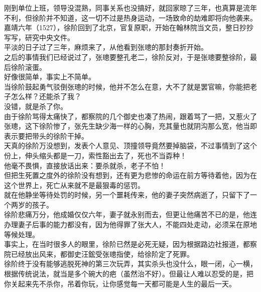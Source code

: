 \begin{multicols}{\theparacolNo}
刚到单位上班，领导没混熟，同事关系也没搞好，就回家晾了三年，也真算是流年不利，但徐阶并不知道，这一切不过是热身运动，一场致命的劫难即将向他袭来。\\

嘉靖六年（1527），徐阶回到了北京，官复原职，开始在翰林院当文员，整日抄抄写写，研究中央文件。\\

平淡的日子过了三年，麻烦来了，从他看到张璁的那封奏折开始。\\

之后的事情我们已经说过了，张璁要整孔老二，徐阶反对，于是张璁要整徐阶，最后徐阶滚蛋。\\

好像很简单，事实上不简单。\\

当徐阶鼓起勇气驳倒张璁的时候，他并不怎么在意，大不了就是罢官嘛，你能把老子怎么样？还能杀了我？\\

没错，就是杀了你。\\

由于徐阶骂得太痛快了，都察院的几个御史也凑了热闹，跟着骂了一把，又惹火了张璁，这下徐阶惨了，张先生缺少海一样的心胸，充其量也就阴沟那么宽，他当即表示要把带头的徐阶干掉。\\

天真的徐阶万没想到，发表个人意见、顶撞领导竟然要掉脑袋，不过事情到了这个份上，伸头缩头都是一刀，索性豁出去了，死也不当孬种！\\

他毫不畏惧，直接放话出来：要杀就杀，老子不怕！\\

但把生死置之度外的徐阶没有想到，还有更为悲惨的命运在前方等待着他，因为在这个世界上，死亡从来就不是最狠毒的惩罚。\\

就在他静坐等待处罚的时候，另一个噩耗传来，他的妻子突然病逝了，只留下了一个两岁的孩子。\\

徐阶悲痛万分，他成婚仅仅六年，妻子就永别而去，但更让他痛苦不已的是，他连办理妻子后事的能力都没有，因为他得罪了张大人，不能四处走动，必须呆在原地等候处理。\\

事实上，在当时很多人的眼里，徐阶已然是必死无疑，因为根据路边社报道，都察院已经放出风来，都御史汪鋐受张璁指使，给徐阶定了死罪。\\

徐阶终于没有能够逃脱死神的第三次玩弄，其实杀头也没什么，眼一闭，心一横，根据传统说法，就当是多个碗大的疤（虽然治不好）。但最让人难以忍受的是，把你关起来先不杀你，吊着你玩，让你感觉每一天都可能是人生的最后一天。\\


\end{multicols}

